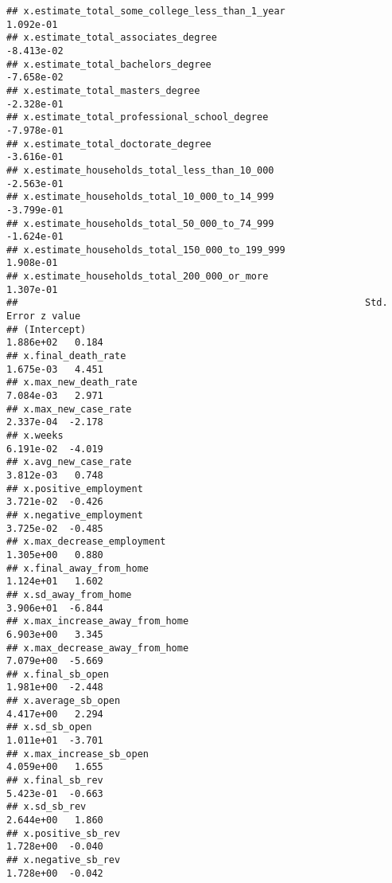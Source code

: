 \documentclass[
]{article}
\begin{document}
\begin{verbatim}
## x.estimate_total_some_college_less_than_1_year               1.092e-01
## x.estimate_total_associates_degree                          -8.413e-02
## x.estimate_total_bachelors_degree                           -7.658e-02
## x.estimate_total_masters_degree                             -2.328e-01
## x.estimate_total_professional_school_degree                 -7.978e-01
## x.estimate_total_doctorate_degree                           -3.616e-01
## x.estimate_households_total_less_than_10_000                -2.563e-01
## x.estimate_households_total_10_000_to_14_999                -3.799e-01
## x.estimate_households_total_50_000_to_74_999                -1.624e-01
## x.estimate_households_total_150_000_to_199_999               1.908e-01
## x.estimate_households_total_200_000_or_more                  1.307e-01
##                                                             Std. Error z value
## (Intercept)                                                  1.886e+02   0.184
## x.final_death_rate                                           1.675e-03   4.451
## x.max_new_death_rate                                         7.084e-03   2.971
## x.max_new_case_rate                                          2.337e-04  -2.178
## x.weeks                                                      6.191e-02  -4.019
## x.avg_new_case_rate                                          3.812e-03   0.748
## x.positive_employment                                        3.721e-02  -0.426
## x.negative_employment                                        3.725e-02  -0.485
## x.max_decrease_employment                                    1.305e+00   0.880
## x.final_away_from_home                                       1.124e+01   1.602
## x.sd_away_from_home                                          3.906e+01  -6.844
## x.max_increase_away_from_home                                6.903e+00   3.345
## x.max_decrease_away_from_home                                7.079e+00  -5.669
## x.final_sb_open                                              1.981e+00  -2.448
## x.average_sb_open                                            4.417e+00   2.294
## x.sd_sb_open                                                 1.011e+01  -3.701
## x.max_increase_sb_open                                       4.059e+00   1.655
## x.final_sb_rev                                               5.423e-01  -0.663
## x.sd_sb_rev                                                  2.644e+00   1.860
## x.positive_sb_rev                                            1.728e+00  -0.040
## x.negative_sb_rev                                            1.728e+00  -0.042

\end{verbatim}
\end{document}

